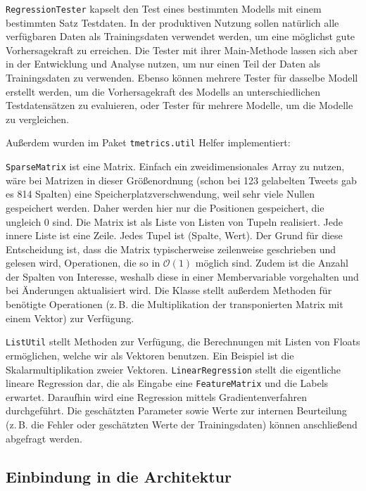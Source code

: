 \texttt{Regression\-Tester} kapselt den Test eines bestimmten Modells mit einem bestimmten Satz Testdaten. In der produktiven Nutzung sollen natürlich alle verfügbaren Daten als Trainingsdaten verwendet werden, um eine möglichst gute Vorhersagekraft zu erreichen. Die Tester mit ihrer Main-Methode lassen sich aber in der Entwicklung und Analyse nutzen, um nur einen Teil der Daten als Trainingsdaten zu verwenden. Ebenso können mehrere Tester für dasselbe Modell erstellt werden, um die Vorhersagekraft des Modells an unterschiedlichen Testdatensätzen zu evaluieren, oder Tester für mehrere Modelle, um die Modelle zu vergleichen.

Außerdem wurden im Paket \texttt{tmetrics.util} Helfer implementiert:

\texttt{Sparse\-Matrix} ist eine Matrix. Einfach ein zweidimensionales Array zu nutzen, wäre bei Matrizen in dieser Größenordnung (schon bei 123 gelabelten Tweets gab es 814 Spalten) eine Speicherplatzverschwendung, weil sehr viele Nullen gespeichert werden. Daher werden hier nur die Positionen gespeichert, die ungleich 0 sind. Die Matrix ist als Liste von Listen von Tupeln realisiert. Jede innere Liste ist eine Zeile. Jedes Tupel ist (Spalte, Wert). Der Grund für diese Entscheidung ist, dass die Matrix typischerweise zeilenweise geschrieben und gelesen wird, Operationen, die so in \( \mathcal O(1) \) möglich sind. Zudem ist die Anzahl der Spalten von Interesse, weshalb diese in einer Membervariable vorgehalten und bei Änderungen aktualisiert wird. Die Klasse stellt außerdem Methoden für benötigte Operationen (z.\,B. die Multiplikation der transponierten Matrix mit einem Vektor) zur Verfügung.

\texttt{List\-Util} stellt Methoden zur Verfügung, die Berechnungen mit Listen von Floats ermöglichen, welche wir als Vektoren benutzen. Ein Beispiel ist die Skalarmultiplikation zweier Vektoren. \texttt{Linear\-Regression} stellt die eigentliche lineare Regression dar, die als Eingabe eine \texttt{Feature\-Matrix} und die Labels erwartet. Daraufhin wird eine Regression mittels Gradientenverfahren durchgeführt. Die geschätzten Parameter sowie Werte zur internen Beurteilung (z.\,B. die Fehler oder geschätzten Werte der Trainingsdaten) können anschließend abgefragt werden. 

\subsection{Einbindung in die Architektur}
\label{subsec:sentimenteinbindung}

